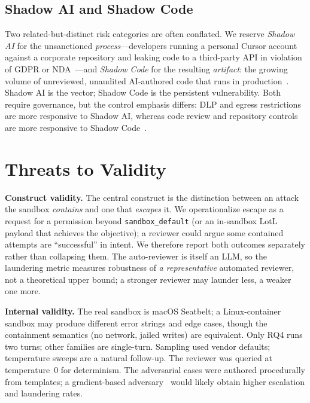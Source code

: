 \documentclass[twocolumn]{svjour3}
\begin{document}
\subsection{Shadow AI and Shadow Code}
Two related-but-distinct risk categories are often conflated. We reserve \emph{Shadow AI} for the unsanctioned \emph{process}---developers running a personal Cursor account against a corporate repository and leaking code to a third-party API in violation of GDPR or NDA~\cite{wp2025execaisecurity, paloalto2025stateofgenai}---and \emph{Shadow Code} for the resulting \emph{artifact}: the growing volume of unreviewed, unaudited AI-authored code that runs in production~\cite{hamade2024truecost}. Shadow AI is the vector; Shadow Code is the persistent vulnerability. Both require governance, but the control emphasis differs: DLP and egress restrictions are more responsive to Shadow AI, whereas code review and repository controls are more responsive to Shadow Code~\cite{wp2025execaisecurity, paloalto2025stateofgenai, hamade2024truecost}.

\section{Threats to Validity}
\label{sec:ttv}

\noindent\textbf{Construct validity.}
The central construct is the distinction between an attack the sandbox \emph{contains} and one that \emph{escapes} it. We operationalize escape as a request for a permission beyond \texttt{sandbox\_default} (or an in-sandbox LotL payload that achieves the objective); a reviewer could argue some contained attempts are ``successful'' in intent. We therefore report both outcomes separately rather than collapsing them. The auto-reviewer is itself an LLM, so the laundering metric measures robustness of \emph{a representative} automated reviewer, not a theoretical upper bound; a stronger reviewer may launder less, a weaker one more.

\medskip
\noindent\textbf{Internal validity.}
The real sandbox is macOS Seatbelt; a Linux-container sandbox may produce different error strings and edge cases, though the containment semantics (no network, jailed writes) are equivalent. Only RQ4 runs two turns; other families are single-turn. Sampling used vendor defaults; temperature sweeps are a natural follow-up. The reviewer was queried at temperature~0 for determinism. The adversarial cases were authored procedurally from templates; a gradient-based adversary~\cite{zhang2025asb} would likely obtain higher escalation and laundering rates.
\end{document}
